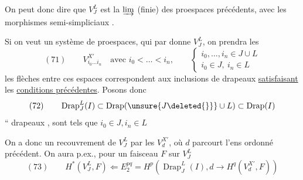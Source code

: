 

On peut donc dire que $V_J^L$ est la $\varinjlim$ (finie) des proespaces précédents, avec  les morphismes semi-simpliciaux  .

Si on veut un système  de proespaces,  qui par  \inserted{$\varinjlim$} donne $V_J^L$, on prendra les
\[
(71)\qquad V_{i_0\ldots i_n}^{X'}\quad\text{avec }i_0<\ldots<i_n,\qquad
\left\{\begin{array}{l}
i_0,\ldots,i_n\in J\cup L\\
i_0\in J,\ i_n\in L
\end{array}\right.
\]
les flèches entre ces espaces correspondent aux inclusions de drapeaux \uline{satisfaisant} les \uline{conditions précédentes}. Posons donc
\[
(72)\qquad\operatorname{Drap}_J^L(I)\subset\operatorname{Drap}(\unsure{J\deleted{\}}}\cup L)\subset\operatorname{Drap}(I)
\]
`` drapeaux ,  sont tels que $i_0\in J,i_n\in L$

On a donc un recouvrement de $V_J^L$ par les $V_d^{X'}$, où $d$ parcourt l'ens ordonné précédent. On aura p.ex., pour un faisceau $F$ sur $V_J^L$
\[
(73)\qquad H^*(V_J^L,F)\Longleftarrow E_2^{pq}=H^p(\operatorname{Drap}_J^L(I),d\to H^q(V_d^{X'},F))
\]
